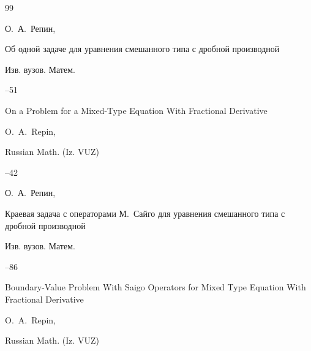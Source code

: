 \begin{thebibliography}{99}




\by О.~А.~Репин,

\paper Об одной задаче для уравнения смешанного типа с дробной производной

\jour Изв. вузов. Матем.



--51


\transl

\paper On a Problem for a Mixed-Type Equation With Fractional Derivative

\by    O.~A.~Repin,

\jour Russian Math. (Iz. VUZ)




--42







\by \by О.~А.~Репин,

\paper Краевая задача с операторами М.~Сайго для уравнения смешанного типа с дробной производной

\jour Изв. вузов. Матем.



--86


\transl

\paper  Boundary-Value Problem With Saigo Operators for Mixed Type Equation With Fractional Derivative

\by O.~A.~Repin, 

\jour Russian Math. (Iz. VUZ)




\end{thebibliography}
